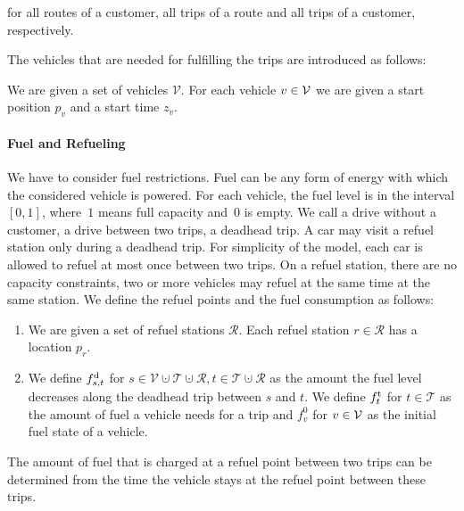 for all routes of a customer, all trips of a route and all trips of a customer, respectively.

The vehicles that are needed for fulfilling the trips are introduced as follows:

\begin{definition}[Vehicles]

We are given a set of vehicles $\mathcal{V}$. For each vehicle $v\in\mathcal{V}$ we are given a start position $p_v$ and a start time $z_v$.

\end{definition}

\paragraph{Fuel and Refueling} \parfill

We have to consider fuel restrictions. Fuel can be any form of energy with which the considered vehicle is powered. For each vehicle, the fuel level is in the interval $[0,1]$, where~$1$ means full capacity and~$0$ is empty. We call a drive without a customer, \ie a drive between two trips, a deadhead trip. A car may visit a refuel station only during a deadhead trip. For simplicity of the model, each car is allowed to refuel at most once between two trips. On a refuel station, there are no capacity constraints, \ie two or more vehicles may refuel at the same time at the same station. We define the refuel points and the fuel consumption as follows:

\begin{definition}

\begin{enumerate}
	\item
We are given a set of refuel stations $\mathcal{R}$. Each refuel station $r\in\mathcal{R}$ has a location $p_r$.

	\item
We define $f^{\operatorname{d}}_{s,t}$ for ${s\in\mathcal{V}\cupdot\mathcal{T}\cupdot\mathcal{R}}, {t\in\mathcal{T}\cupdot\mathcal{R}}$ as the amount the fuel level decreases along the deadhead trip between $s$ and $t$. We define $f^{\operatorname{t}}_t$ for ${t\in\mathcal{T}}$ as the amount of fuel a vehicle needs for a trip and $f^0_v$ for $v\in\mathcal{V}$ as the initial fuel state of a vehicle.
\end{enumerate}

\end{definition}

The amount of fuel that is charged at a refuel point between two trips can be determined from the time the vehicle stays at the refuel point between these trips. 

